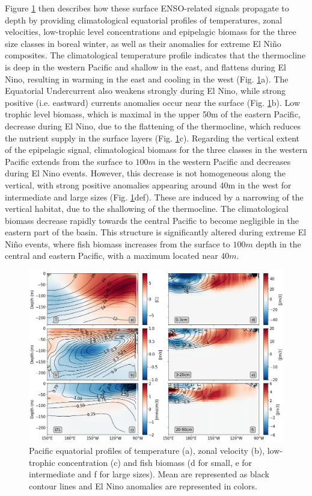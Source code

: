 Figure \ref{fig:profiles} then describes how these surface ENSO-related signals propagate to depth by providing climatological equatorial profiles of temperatures, zonal velocities, low-trophic level concentrations and  epipelagic biomass for the three size classes in boreal winter, as well as their anomalies for extreme El Niño composites. The climatological temperature profile indicates that the thermocline is deep in the western Pacific and shallow in the east, and flattens during El Nino, resulting in warming in the east and cooling in the west (Fig. \ref{fig:profiles}a). The Equatorial Undercurrent also weakens strongly during El Nino, while strong positive (i.e. eastward) currents anomalies occur near the surface (Fig. \ref{fig:profiles}b). Low trophic level biomass, which is maximal in the upper 50m of the eastern Pacific, decrease during El Nino, due to the flattening of the thermocline, which reduces the nutrient supply in the surface layers (Fig. \ref{fig:profiles}c). Regarding the vertical extent of the epipelagic signal, climatological biomass for the three classes in the western Pacific extends from the surface to $100m$ in the western Pacific and decreases during El Nino events. However, this decrease is not homogeneous along the vertical, with strong positive anomalies appearing around 40m in the west for intermediate and large sizes (Fig. \ref{fig:profiles}def). These are induced by a narrowing of the vertical habitat, due to the shallowing of the thermocline. The climatological biomass decrease rapidly towards the central Pacific to become negligible in the eastern part of the basin. This structure is significantly altered during extreme El Niño events, where fish biomass increases from the surface to $100m$ depth in the central and eastern Pacific, with a maximum located near $40m$.

\begin{figure}[h!tp]
	\centering
	\includegraphics[scale=0.4]{figs/forage_mean_ond97.png}	
	\caption{Pacific equatorial profiles of temperature (a), zonal velocity (b), low-trophic concentration (c) and fish biomass (d for small, e for intermediate and f for large sizes). Mean are represented as black contour lines and El Nino anomalies are represented in colors.}	
	\label{fig:profiles}
\end{figure}

